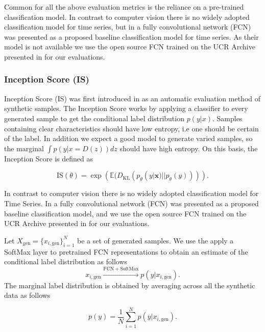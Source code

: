 \documentclass[../../thesis.tex]{subfiles}
\begin{document}
Common for all the above evaluation metrics is the reliance on a pre-trained classification model. In contrast to computer vision there is no widely adopted classification model for time series, but in \cite{wang2016time} a fully convolutional network (FCN) was presented as a proposed baseline classification model for time series. As their model is not available we use the open source FCN trained on the UCR Archive presented in \cite{TimeVQVAE} for our evaluations.\newline

\subsubsection{Inception Score (IS)}
Inception Score (IS) was first introduced in \cite{salimans2016improved} as an automatic evaluation method of synthetic samples.\newline
The Inception Score works by applying a classifier to every generated sample to get the conditional label distribution $p(y|x)$. Samples containing clear characteristics should have low entropy, i.e one should be certain of the label. In addition we expect a good model to generate varied samples, so the marginal $\int p(y|x = D(z))dz$ should have high entropy. On this basis, the Inception Score is defined as 

\begin{equation}
    \label{IS}
    {\text{IS}}(\theta) = \exp\left( \mathbb{E}(D_{\text{KL}}(p_\theta(y|\mathbf{x}) || p_\theta(y))) \right).
\end{equation}

In contrast to computer vision there is no widely adopted classification model for Time Series. In \cite{wang2016time} a fully convolutional network (FCN) was presented as a proposed baseline classification model, and we use the open source FCN trained on the UCR Archive presented in \cite{TimeVQVAE} for our evaluations. \newline

Let $X_{\text{gen}} = \{x_{i,\text{gen}}\}_{i=1}^N$ be a set of generated samples. We use the apply a SoftMax layer to pretrained FCN representations to obtain an estimate of the conditional label distribution as follows
\[
    x_{i,\text{gen}} \xrightarrow{\mathrm{FCN} + \mathrm{SoftMax}} p(y |x_{i,\text{gen}}).
\]
The marginal label distribution is obtained by averaging across all the synthetic data as follows

\[
    p(y) = \frac{1}{N} \sum_{i=1}^N p(y |x_{i,\text{gen}}).
\]
\end{document}

